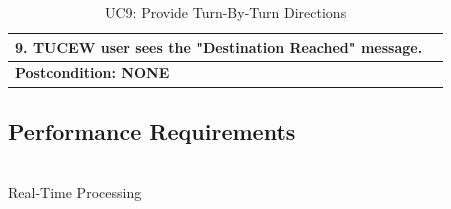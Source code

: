 \documentclass[runningheads,a4paper]{article}
\begin{document}
\begin{table}[H]
\begin{tabular}{|l|l|}
9. TUCEW user sees the "Destination Reached" message.                                                                                                                                                           &                                                                                                                                                                                                                                                                                                                                               \\ \hline
\textbf{Postcondition: NONE}                                                                                                                                                                                    &                                                                                                                                                                                                                                                                                                                                               \\ \hline
\end{tabular}
\caption{UC9: Provide Turn-By-Turn Directions}
\end{table}


\pagebreak
\subsection{Performance Requirements}


\noindent \\ Real-Time Processing
\end{document}
